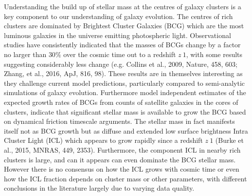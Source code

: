 \documentclass[a4paper,11pt]{article}
\begin{document}
\noindent
Understanding the build up of stellar mass at the centres of galaxy
clusters is a key component to our understanding of galaxy
evolution. The centres of rich clusters are dominated by Brightest
Cluster Galaxies (BCG) which are the most luminous galaxies in the
universe emitting photospheric light. Observational studies have
consistently indicated that the masses of BCGs change by a factor no
larger than $30\%$ over the cosmic time out to a redshift $ z~1$, with
some results suggesting considerably less change (e.g. Collins et al.,
2009, Nature, 458, 603; Zhang, et al., 2016, ApJ, 816, 98). These
results are in themselves interesting as they challenge current model
predictions, particularly compared to semi-analytic simulations of
galaxy evolution. Furthermore model independent estimates of the
expected growth rates of BCGs from counts of satellite galaxies in the
cores of clusters, indicate that significant stellar mass is available
to grow the BCG based on dynamical friction timescale arguments. The
stellar mass in fact manifests itself not as BCG growth but as diffuse
and extended low surface brightness Intra Cluster Light (ICL) which
appears to grow rapidly since a redshift $z~1$ (Burke et al., 2015,
MNRAS, 449, 2353). Furthermore, the component ICL in nearby rich
clusters is large, and can it appears can even dominate the BCG
stellar mass. However there is no consensus on how the ICL grows with
cosmic time or even how the ICL fraction depends on cluster mass or
other parameters, with different conclusions in the literature largely
due to varying data quality.
\end{document}
